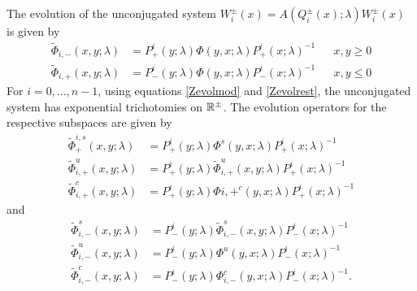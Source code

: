 \documentclass[thesis.tex]{subfiles}
\begin{document}
The evolution of the unconjugated system $W_i^\pm(x) = A(Q_i^\pm(x); \lambda) W_i^\pm(x)$ is given by
\begin{equation}\label{unconjevol2}
\begin{aligned}
\tilde{\Phi}_{i,-}(x, y; \lambda) &= P^i_+(y; \lambda) \Phi(y, x; \lambda) P^i_+(x; \lambda)^{-1} && x, y \geq 0  \\
\tilde{\Phi}_{i,+}(x, y; \lambda) &= P^i_-(y; \lambda) \Phi(y, x; \lambda) P^i_-(x; \lambda)^{-1} && x, y \leq 0
\end{aligned}
\end{equation}
For $i = 0, \dots, n-1$, using equations \cref{Zevolmod} and \cref{Zevolrest}, the unconjugated system has exponential trichotomies on $\mathbb{R}^\pm$. The evolution operators for the respective subspaces are given by
\begin{equation}\label{trichunconjplus}
\begin{aligned}
\tilde{\Phi}_+^{i, s}(x, y; \lambda) &= P^i_+(y; \lambda) \Phi^{s}(y, x; \lambda) P^i_+(x; \lambda)^{-1} \\
\tilde{\Phi}_{i,+}^{u}(x, y; \lambda) &= P^i_+(y; \lambda) \tilde{\Phi}_{i,+}^{u}(x, y; \lambda) P^i_+(x; \lambda)^{-1} \\
\tilde{\Phi}_{i,+}^{c}(x, y; \lambda) &= P^i_+(y; \lambda) \Phi{i,+}^{c}(y, x; \lambda) P^i_+(x; \lambda)^{-1}
\end{aligned}
\end{equation}
and
\begin{equation}\label{trichunconjminus}
\begin{aligned}
\tilde{\Phi}_{i,-}^{s}(x, y; \lambda) &= P^i_-(y; \lambda) \tilde{\Phi}_{i,-}^{s}(x, y; \lambda) P^i_-(x; \lambda)^{-1} \\
\tilde{\Phi}_{i,-}^{u}(x, y; \lambda) &= P^i_-(y; \lambda) \Phi^{u}(y, x; \lambda) P^i_-(x; \lambda)^{-1} \\
\tilde{\Phi}_{i,-}^{c}(x, y; \lambda) &= P^i_-(y; \lambda) \Phi_{i,-}^{c}(y, x; \lambda) P^i_-(x; \lambda)^{-1}.
\end{aligned}
\end{equation}
\end{document}
